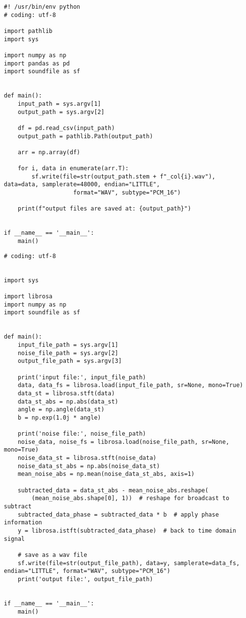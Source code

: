 \begin{lstlisting}[caption=csv\_to\_wav\_each\_column.py,label=csv\_to\_wav\_each\_column.py]
#! /usr/bin/env python
# coding: utf-8

import pathlib
import sys

import numpy as np
import pandas as pd
import soundfile as sf


def main():
    input_path = sys.argv[1]
    output_path = sys.argv[2]

    df = pd.read_csv(input_path)
    output_path = pathlib.Path(output_path)

    arr = np.array(df)

    for i, data in enumerate(arr.T):
        sf.write(file=str(output_path.stem + f"_col{i}.wav"), data=data, samplerate=48000, endian="LITTLE",
                    format="WAV", subtype="PCM_16")

    print(f"output files are saved at: {output_path}")


if __name__ == '__main__':
    main()
\end{lstlisting}

\begin{lstlisting}[caption=calc\_subtracted\_wav.py,label=calc\_subtracted\_wav.py]
# coding: utf-8


import sys

import librosa
import numpy as np
import soundfile as sf


def main():
    input_file_path = sys.argv[1]
    noise_file_path = sys.argv[2]
    output_file_path = sys.argv[3]

    print('input file:', input_file_path)
    data, data_fs = librosa.load(input_file_path, sr=None, mono=True)
    data_st = librosa.stft(data)
    data_st_abs = np.abs(data_st)
    angle = np.angle(data_st)
    b = np.exp(1.0j * angle)

    print('noise file:', noise_file_path)
    noise_data, noise_fs = librosa.load(noise_file_path, sr=None, mono=True)
    noise_data_st = librosa.stft(noise_data)
    noise_data_st_abs = np.abs(noise_data_st)
    mean_noise_abs = np.mean(noise_data_st_abs, axis=1)

    subtracted_data = data_st_abs - mean_noise_abs.reshape(
        (mean_noise_abs.shape[0], 1))  # reshape for broadcast to subtract
    subtracted_data_phase = subtracted_data * b  # apply phase information
    y = librosa.istft(subtracted_data_phase)  # back to time domain signal

    # save as a wav file
    sf.write(file=str(output_file_path), data=y, samplerate=data_fs, endian="LITTLE", format="WAV", subtype="PCM_16")
    print('output file:', output_file_path)


if __name__ == '__main__':
    main()

\end{lstlisting}

